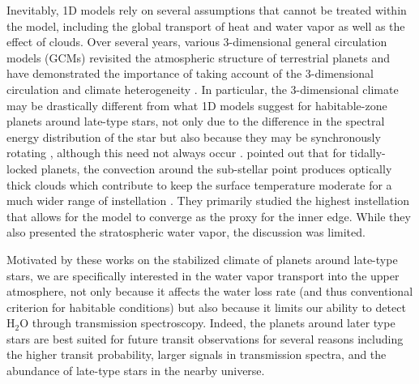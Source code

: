 \documentclass[11pt,numberedappendix,twocolappendix,]{emulateapj}
\def\water{H$_2$O }
\begin{document}
Inevitably, 1D models rely on several assumptions that cannot be treated within the model, including the global transport of heat and water vapor as well as the effect of clouds. 
Over several years, various 3-dimensional general circulation models (GCMs) revisited the atmospheric structure of terrestrial planets and have demonstrated the importance of taking account of the 3-dimensional circulation and climate heterogeneity \citep[e.g.,][]{Ishiwatari2002,Abe2011,Leconte2013a,Leconte2013b,Wolf2014,Wolf2015}. 
In particular, the 3-dimensional climate may be drastically different from what 1D models suggest for habitable-zone planets around late-type stars, not only due to the difference in the spectral energy distribution of the star but also because they may be synchronously rotating \citep{Dole1964, Kasting1993}, although this need not always occur \citep{Goldreich1966,Leconte2015}.  
%
\citet{Yang2013} pointed out that for tidally-locked planets, the convection around the sub-stellar point produces optically thick clouds which contribute to keep the surface temperature moderate for a much wider range of instellation \citep[see also][]{Yang2014,Way2015,Kopparapu2016}. 
They primarily studied the highest instellation that allows for the model to converge as the proxy for the inner edge. 
While they also presented the stratospheric water vapor, the discussion was limited. 

Motivated by these works on the stabilized climate of planets around late-type stars, we are specifically interested in the water vapor transport  into the upper atmosphere, not only because it affects the water loss rate (and thus conventional criterion for habitable conditions) but also because it limits our ability to detect \water through transmission spectroscopy. 
%
Indeed, the planets around later type stars are best suited for future transit observations for several reasons including the higher transit probability, larger signals in transmission spectra, and the abundance of late-type stars in the nearby universe. 
\end{document}
